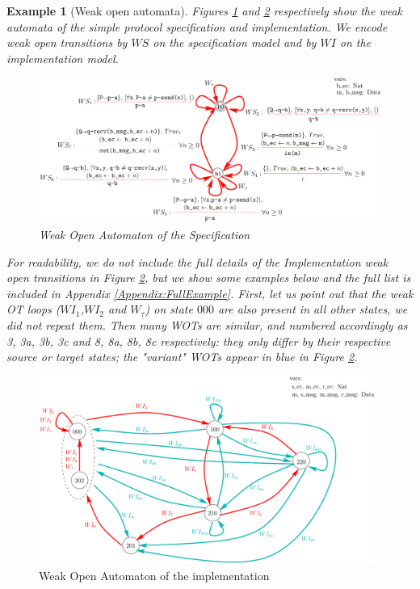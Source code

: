 \documentclass{lmcs}
\newtheorem{example}{Example}
\begin{document}
  \begin{example}[Weak open automata]
    Figures \ref{SimpleProtCounter:WeakSpecOA} and \ref{SimpleProtCounter:ImplWOA2} respectively show the weak automata of the simple protocol specification and implementation. We encode weak open transitions  by $WS$ on the specification model and by $WI$ on the implementation model.
    



\begin{figure}[h]
   \centerline{\includegraphics[width=15cm]{XFIG/SPSpecWeakOpen}}
  \caption{Weak Open Automaton of the Specification}
   \label{SimpleProtCounter:WeakSpecOA}
\end{figure}

 For readability, we do not include the full details of the Implementation weak open transitions in Figure \ref{SimpleProtCounter:ImplWOA2}, but we show some examples below and the full list is included in Appendix \ref{Appendix:FullExample}.
First, let us point out that the weak OT loops ($WI_1$,$WI_2$ and $W_\tau$) on state ${000}$ are also present in all other states, we did not repeat them. Then many WOTs are similar, and numbered accordingly as 3, 3a, 3b, 3c and 8, 8a, 8b, 8c respectively: they only differ by their respective source or target states; the "variant" WOTs appear in blue in   Figure \ref{SimpleProtCounter:ImplWOA2}.
\end{example}




\begin{figure}[h]
   \centerline{\includegraphics[width=11cm]{XFIG/SimpleProtImpl-WOA2}}
  \caption{Weak Open Automaton of the implementation}
   \label{SimpleProtCounter:ImplWOA2}
\end{figure}
\end{document}
